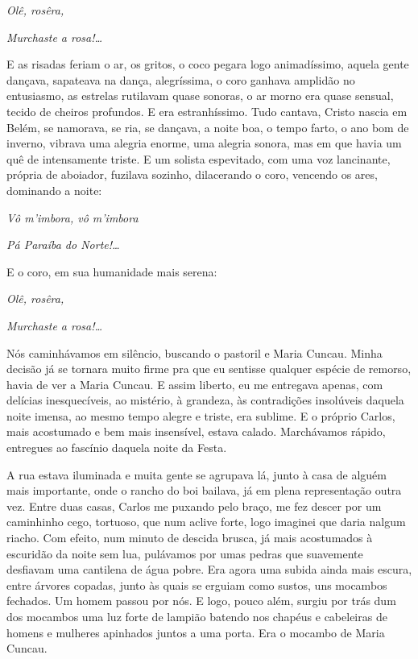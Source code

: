 \begin{linenumbers}
\emph{Olê, rosêra,}

\emph{Murchaste a rosa!\ldots{}}

E as risadas feriam o ar, os gritos, o coco pegara logo animadíssimo,
aquela gente dançava, sapateava na dança, alegríssima, o coro ganhava
amplidão no entusiasmo, as estrelas rutilavam quase sonoras, o ar morno
era quase sensual, tecido de cheiros profundos. E era estranhíssimo.
Tudo cantava, Cristo nascia em Belém, se namorava, se ria, se dançava, a
noite boa, o tempo farto, o ano bom de inverno, vibrava uma alegria
enorme, uma alegria sonora, mas em que havia um quê de intensamente
triste. E um solista espevitado, com uma voz lancinante, própria de
aboiador, fuzilava sozinho, dilacerando o coro, vencendo os ares,
dominando a noite:

\emph{Vô m'imbora, vô m'imbora}

\emph{Pá Paraíba do Norte!\ldots{}}

E o coro, em sua humanidade mais serena:

\emph{Olê, rosêra,}

\emph{Murchaste a rosa!\ldots{}}

Nós caminhávamos em silêncio, buscando o pastoril e Maria Cuncau. Minha
decisão já se tornara muito firme pra que eu sentisse qualquer espécie
de remorso, havia de ver a Maria Cuncau. E assim liberto, eu me
entregava apenas, com delícias inesquecíveis, ao mistério, à grandeza,
às contradições insolúveis daquela noite imensa, ao mesmo tempo alegre e
triste, era sublime. E o próprio Carlos, mais acostumado e bem mais
insensível, estava calado. Marchávamos rápido, entregues ao fascínio
daquela noite da Festa.

A rua estava iluminada e muita gente se agrupava lá, junto à casa de
alguém mais importante, onde o rancho do boi bailava, já em plena
representação outra vez. Entre duas casas, Carlos me puxando pelo braço,
me fez descer por um caminhinho cego, tortuoso, que num aclive forte,
logo imaginei que daria nalgum riacho. Com efeito, num minuto de descida
brusca, já mais acostumados à escuridão da noite sem lua, pulávamos por
umas pedras que suavemente desfiavam uma cantilena de água pobre. Era
agora uma subida ainda mais escura, entre árvores copadas, junto às
quais se erguiam como sustos, uns mocambos fechados. Um homem passou por
nós. E logo, pouco além, surgiu por trás dum dos mocambos uma luz forte
de lampião batendo nos chapéus e cabeleiras de homens e mulheres
apinhados juntos a uma porta. Era o mocambo de Maria Cuncau.


\end{linenumbers}

